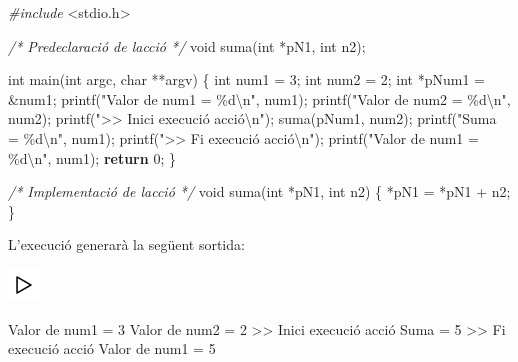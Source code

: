 \documentclass[]{book}
\newenvironment{Shaded}{\begin{snugshade}}{\end{snugshade}}
\newcommand{\CommentTok}[1]{\textcolor[rgb]{0.56,0.35,0.01}{\textit{#1}}}
\newcommand{\ControlFlowTok}[1]{\textcolor[rgb]{0.13,0.29,0.53}{\textbf{#1}}}
\newcommand{\DataTypeTok}[1]{\textcolor[rgb]{0.13,0.29,0.53}{#1}}
\newcommand{\DecValTok}[1]{\textcolor[rgb]{0.00,0.00,0.81}{#1}}
\newcommand{\ImportTok}[1]{#1}
\newcommand{\NormalTok}[1]{#1}
\newcommand{\PreprocessorTok}[1]{\textcolor[rgb]{0.56,0.35,0.01}{\textit{#1}}}
\newcommand{\SpecialCharTok}[1]{\textcolor[rgb]{0.00,0.00,0.00}{#1}}
\newcommand{\StringTok}[1]{\textcolor[rgb]{0.31,0.60,0.02}{#1}}
\begin{document}
\begin{Shaded}
\begin{Highlighting}[]
\PreprocessorTok{\#include }\ImportTok{\textless{}stdio.h\textgreater{}}

\CommentTok{/* Predeclaració de l\textquotesingle{}acció */}
\DataTypeTok{void}\NormalTok{ suma(}\DataTypeTok{int}\NormalTok{ *pN1, }\DataTypeTok{int}\NormalTok{ n2);}

\DataTypeTok{int}\NormalTok{ main(}\DataTypeTok{int}\NormalTok{ argc, }\DataTypeTok{char}\NormalTok{ **argv) \{}
    \DataTypeTok{int}\NormalTok{ num1 = }\DecValTok{3}\NormalTok{;}
    \DataTypeTok{int}\NormalTok{ num2 = }\DecValTok{2}\NormalTok{;}
    \DataTypeTok{int}\NormalTok{ *pNum1 = \&num1;}
\NormalTok{    printf(}\StringTok{"Valor de num1 = \%d}\SpecialCharTok{\textbackslash{}n}\StringTok{"}\NormalTok{, num1);}
\NormalTok{    printf(}\StringTok{"Valor de num2 = \%d}\SpecialCharTok{\textbackslash{}n}\StringTok{"}\NormalTok{, num2);}
\NormalTok{    printf(}\StringTok{"\textgreater{}\textgreater{} Inici execució acció}\SpecialCharTok{\textbackslash{}n}\StringTok{"}\NormalTok{); }
\NormalTok{    suma(pNum1, num2);}
\NormalTok{    printf(}\StringTok{"Suma = \%d}\SpecialCharTok{\textbackslash{}n}\StringTok{"}\NormalTok{, num1);}
\NormalTok{    printf(}\StringTok{"\textgreater{}\textgreater{} Fi execució acció}\SpecialCharTok{\textbackslash{}n}\StringTok{"}\NormalTok{);}
\NormalTok{    printf(}\StringTok{"Valor de num1 = \%d}\SpecialCharTok{\textbackslash{}n}\StringTok{"}\NormalTok{, num1);}
    \ControlFlowTok{return} \DecValTok{0}\NormalTok{;}
\NormalTok{\}}

\CommentTok{/* Implementació de l\textquotesingle{}acció */}
\DataTypeTok{void}\NormalTok{ suma(}\DataTypeTok{int}\NormalTok{ *pN1, }\DataTypeTok{int}\NormalTok{ n2) \{}
\NormalTok{    *pN1 = *pN1 + n2;}
\NormalTok{\}}
\end{Highlighting}
\end{Shaded}

L'execució generarà la següent sortida:

\includegraphics{./img/play.png}

\begin{Shaded}
\begin{Highlighting}[]
\NormalTok{Valor de num1 = }\DecValTok{3}
\NormalTok{Valor de num2 = }\DecValTok{2}
\NormalTok{\textgreater{}\textgreater{} Inici execució acció}
\NormalTok{Suma = }\DecValTok{5}
\NormalTok{\textgreater{}\textgreater{} Fi execució acció}
\NormalTok{Valor de num1 = }\DecValTok{5}
\end{Highlighting}
\end{Shaded}
\end{document}
